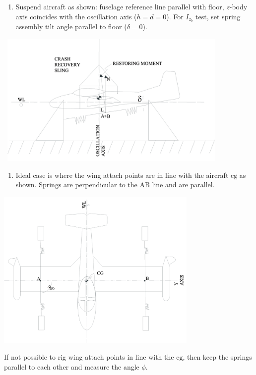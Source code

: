 \documentclass[
]{book}
\providecommand{\tightlist}{%
  \setlength{\itemsep}{0pt}\setlength{\parskip}{0pt}}
\begin{document}
\begin{enumerate}
\def\labelenumi{\arabic{enumi}.}
\tightlist
\item
  Suspend aircraft as shown: fuselage reference line parallel with floor, \(z\)-body axis coincides with the oscillation axis (\(h = d = 0\)). For \(I_{z_b}\) test, set spring assembly tilt angle parallel to floor (\(\delta = 0\)).
\end{enumerate}

\includegraphics[width=4.5in,height=2.57292in]{media/07/image36.svg}~

\begin{enumerate}
\def\labelenumi{\arabic{enumi}.}
\setcounter{enumi}{1}
\tightlist
\item
  Ideal case is where the wing attach points are in line with the aircraft \(\mathrm{cg}\) as shown. Springs are perpendicular to the AB line and are parallel.
\end{enumerate}

\includegraphics[width=3.83194in,height=3.08333in]{media/07/image37.svg}

If not possible to rig wing attach points in line with the \(\mathrm{cg}\), then keep the springs parallel to each other and measure the angle \(\phi\).~~
\end{document}
